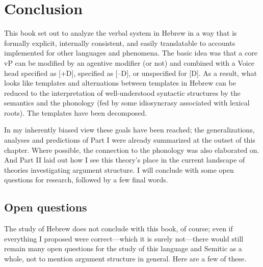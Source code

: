 


\section{Conclusion} \label{i:conc}
This book set out to analyze the verbal system in Hebrew in a way that is formally explicit, internally consistent, and easily translatable to accounts implemented for other languages and phenomena. The basic idea was that a core vP can be modified by an agentive modifier (or not) and combined with a Voice head specified as [\!+\!D], specified as [--D], or unspecified for [D]. As a result, what looks like templates and alternations between templates in Hebrew can be reduced to the interpretation of well-understood syntactic structures by the semantics and the phonology (fed by some idiosyncrasy associated with lexical roots). The templates have been decomposed.

In my inherently biased view these goals have been reached; the generalizations, analyses and predictions of Part I were already summarized at the outset of this chapter. Where possible, the connection to the phonology was also elaborated on. And Part II laid out how I see this theory's place in the current landscape of theories investigating argument structure. I will conclude with some open questions for research, followed by a few final words.

	\subsection{Open questions}
The study of Hebrew does not conclude with this book, of course; even if everything I proposed were correct---which it is surely not---there would still remain many open questions for the study of this language and Semitic as a whole, not to mention argument structure in general. Here are a few of these.

